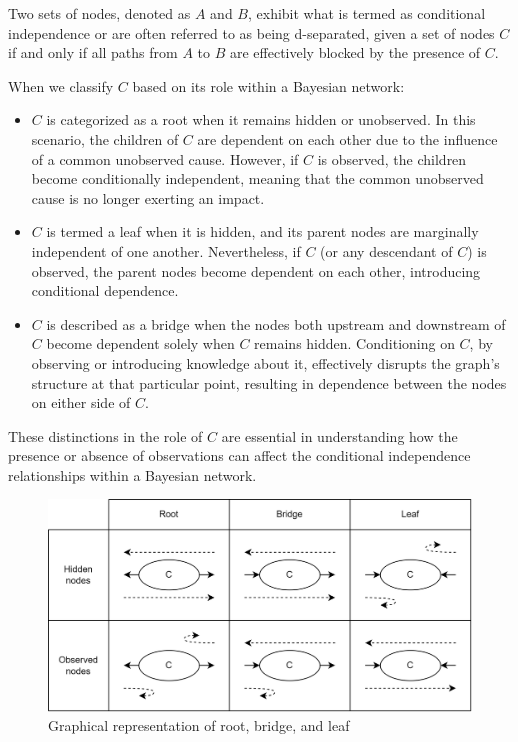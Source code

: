 \begin{definition}
    Two sets of nodes, denoted as $A$ and $B$, exhibit what is termed as conditional independence or are often referred to as being d-separated, given a set of nodes $C$ if and only if all paths from $A$ to $B$ are effectively blocked by the presence of $C$.
\end{definition}
When we classify $C$ based on its role within a Bayesian network:
\begin{itemize}
    \item $C$ is categorized as a root when it remains hidden or unobserved. 
        In this scenario, the children of $C$ are dependent on each other due to the influence of a common unobserved cause. 
        However, if $C$ is observed, the children become conditionally independent, meaning that the common unobserved cause is no longer exerting an impact.
    \item $C$ is termed a leaf when it is hidden, and its parent nodes are marginally independent of one another. 
        Nevertheless, if $C$ (or any descendant of $C$) is observed, the parent nodes become dependent on each other, introducing conditional dependence.
    \item $C$ is described as a bridge when the nodes both upstream and downstream of $C$ become dependent solely when $C$ remains hidden. 
        Conditioning on $C$, by observing or introducing knowledge about it, effectively disrupts the graph's structure at that particular point, resulting in dependence between the nodes on either side of $C$.
\end{itemize}
These distinctions in the role of $C$ are essential in understanding how the presence or absence of observations can affect the conditional independence relationships within a Bayesian network.
\begin{figure}[H]
    \centering
    \includegraphics[width=0.75\linewidth]{images/def.png}
    \caption{Graphical representation of root, bridge, and leaf}
\end{figure}

